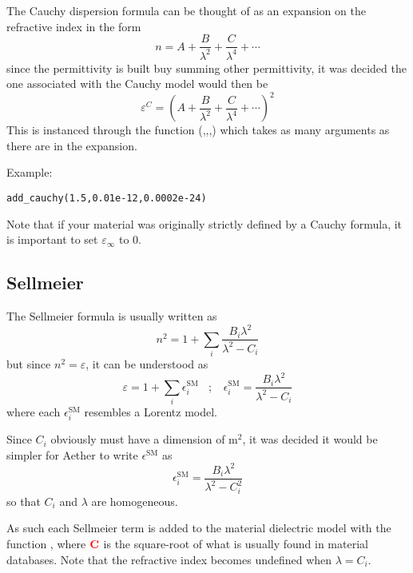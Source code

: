 The Cauchy dispersion formula can be thought of as an expansion on the refractive index in the form
\begin{equation}
	n=A+\frac{B}{\lambda^2}+\frac{C}{\lambda^4}+\cdots
\end{equation}
since the permittivity is built buy summing other permittivity, it was decided the one associated with the Cauchy model would then be
\begin{equation}
	\varepsilon^C=\left(A+\frac{B}{\lambda^2}+\frac{C}{\lambda^4}+\cdots\right)^2
\end{equation}
This is instanced through the function (,,,) which takes as many arguments as there are in the expansion.

Example:
\begin{lstlisting}
add_cauchy(1.5,0.01e-12,0.0002e-24)
\end{lstlisting}
Note that if your material was originally strictly defined by a Cauchy formula, it is important to set $\varepsilon_\infty$ to 0.

\subsection{Sellmeier}

The Sellmeier formula is usually written as
\begin{equation}
	n^2=1+\sum_i \frac{B_i \lambda^2}{\lambda^2-C_i}
\end{equation}
but since $n^2=\varepsilon$, it can be understood as 
\begin{equation}
	\varepsilon=1+\sum_i \epsilon^\textrm{SM}_i ~~~~ ; ~~~~ \epsilon^\textrm{SM}_i=\frac{B_i \lambda^2}{\lambda^2-C_i}
\end{equation}
where each $\epsilon^\textrm{SM}_i$ resembles a Lorentz model.

Since $C_i$ obviously must have a dimension of m$^2$, it was decided it would be simpler for Aether to write $\epsilon^\textrm{SM}$ as
\begin{equation}
	\epsilon^\textrm{SM}_i=\frac{B_i \lambda^2}{\lambda^2-C_i^2}
\end{equation}
so that $C_i$ and $\lambda$ are homogeneous.

As such each Sellmeier term is added to the material dielectric model with the function , where $\textbf{\textcolor{red}{C}}$ is the square-root of what is usually found in material databases. Note that the refractive index becomes undefined when $\lambda=C_i$.

